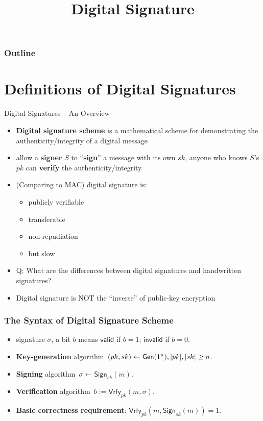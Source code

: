 

\title{Digital Signature}


\maketitle
\begin{frame}
\frametitle{Outline}
\tableofcontents
\end{frame}
\section{Definitions of Digital Signatures}
\begin{frame}{Digital Signatures -- An Overview}
\begin{itemize}
\item \textbf{Digital signature scheme} is a mathematical scheme for demonstrating the authenticity/integrity of a digital message
\item allow a \textbf{signer} $S$ to ``\textbf{sign}'' a message with its own $sk$, anyone who knows $S$'s $pk$ can \textbf{verify} the authenticity/integrity
\item (Comparing to MAC) digital signature is:
\begin{itemize}
\item publicly verifiable
\item transferable
\item non-repudiation
\item but slow
\end{itemize}
\item \alert{Q: What are the differences between digital signatures and handwritten signatures?}
\item Digital signature is NOT the ``inverse'' of public-key encryption
\end{itemize}
\end{frame}
\begin{frame}\frametitle{The Syntax of Digital Signature Scheme}
\begin{figure}
\begin{center}

\end{center}
\end{figure}
\begin{itemize}
\item signature $\sigma$, a bit $b$ means $\mathsf{valid}$ if $b=1$; $\mathsf{invalid}$ if $b=0$.
\item \textbf{Key-generation} algorithm~$(pk,sk) \gets \mathsf{Gen}(1^n), \lvert pk\rvert,\lvert sk\rvert \ge n$.
\item \textbf{Signing} algorithm~$\sigma \gets \mathsf{Sign}_{sk}(m)$.
\item \textbf{Verification} algorithm~$b:= \mathsf{Vrfy}_{pk}(m,\sigma)$.
\item \textbf{Basic correctness requirement}: $\mathsf{Vrfy}_{pk}(m,\mathsf{Sign}_{sk}(m)) = 1$.
\end{itemize}
\end{frame}
